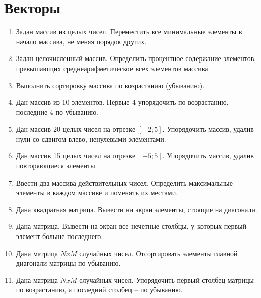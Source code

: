 \section{Векторы}
\begin{enumerate}[leftmargin=*]
    \item Задан массив из  целых чисел. Переместить все минимальные элементы в начало массива, не меняя порядок других. 
    \item Задан целочисленный массив. Определить процентное содержание элементов, превышающих среднеарифметическое всех элементов массива.
    \item Выполнить сортировку массива по возрастанию (убыванию).
    \item Дан массив из 10 элементов. Первые 4 упорядочить по возрастанию, последние 4 по убыванию.
    \item Дан массив 20 целых чисел на отрезке $[-2; 5]$. Упорядочить массив, удалив нули со сдвигом влево, ненулевыми элементами.
    \item Дан массив 15 целых чисел на отрезке $[-5; 5]$. Упорядочить массив, удалив повторяющиеся элементы.
    \item Ввести два массива действительных чисел. Определить максимальные элементы в каждом массиве и поменять их местами. 
    \item Дана квадратная матрица. Вывести на экран элементы, стоящие на диагонали.
    \item Дана матрица. Вывести на экран все нечетные столбцы, у которых первый элемент больше последнего.
    \item Дана матрица $NxM$ случайных чисел. Отсортировать элементы главной диагонали матрицы по убыванию.
    \item Дана матрица $NxM$ случайных чисел. Упорядочить первый столбец матрицы по возрастанию, а последний столбец – по убыванию.
\end{enumerate}

